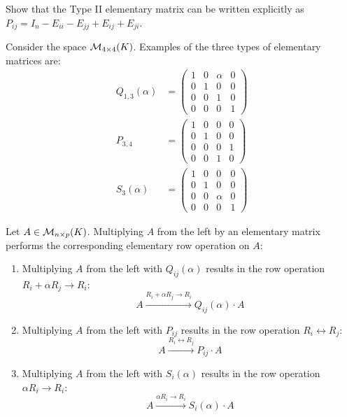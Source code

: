 \begin{exercise}
Show that the Type II elementary matrix can be written explicitly as $P_{ij} = I_n - E_{ii} - E_{jj} + E_{ij} + E_{ji}$.
\end{exercise}

\begin{example}
Consider the space $\mathcal{M}_{4 \times 4}(K)$. Examples of the three types of elementary matrices are:
\begin{align*}
    Q_{1,3}(\alpha) &= \begin{pmatrix} 1 & 0 & \alpha & 0 \\ 0 & 1 & 0 & 0 \\ 0 & 0 & 1 & 0 \\ 0 & 0 & 0 & 1 \end{pmatrix} \\
    P_{3,4} &= \begin{pmatrix} 1 & 0 & 0 & 0 \\ 0 & 1 & 0 & 0 \\ 0 & 0 & 0 & 1 \\ 0 & 0 & 1 & 0 \end{pmatrix} \\
    S_3(\alpha) &= \begin{pmatrix} 1 & 0 & 0 & 0 \\ 0 & 1 & 0 & 0 \\ 0 & 0 & \alpha & 0 \\ 0 & 0 & 0 & 1 \end{pmatrix}
\end{align*}
\end{example}

\begin{lemma}
\label{lemma:row_operations_matrix_multiplication}
Let $A \in \mathcal{M}_{n \times p}(K)$. Multiplying $A$ from the left by an elementary matrix performs the corresponding elementary row operation on $A$:
\begin{enumerate}
    \item Multiplying $A$ from the left with $Q_{ij}(\alpha)$ results in the row operation $R_i + \alpha R_j \longrightarrow R_i$:
    \begin{equation*}
        A \xrightarrow{R_i + \alpha R_j \longrightarrow R_i} Q_{ij}(\alpha) \cdot A
    \end{equation*}
    \item Multiplying $A$ from the left with $P_{ij}$ results in the row operation $R_i \leftrightarrow R_j$:
    \begin{equation*}
        A \xrightarrow{R_i \leftrightarrow R_j} P_{ij} \cdot A
    \end{equation*}
    \item Multiplying $A$ from the left with $S_i(\alpha)$ results in the row operation $\alpha R_i \longrightarrow R_i$:
    \begin{equation*}
        A \xrightarrow{\alpha R_i \longrightarrow R_i} S_i(\alpha) \cdot A
    \end{equation*}
\end{enumerate}
\end{lemma}

